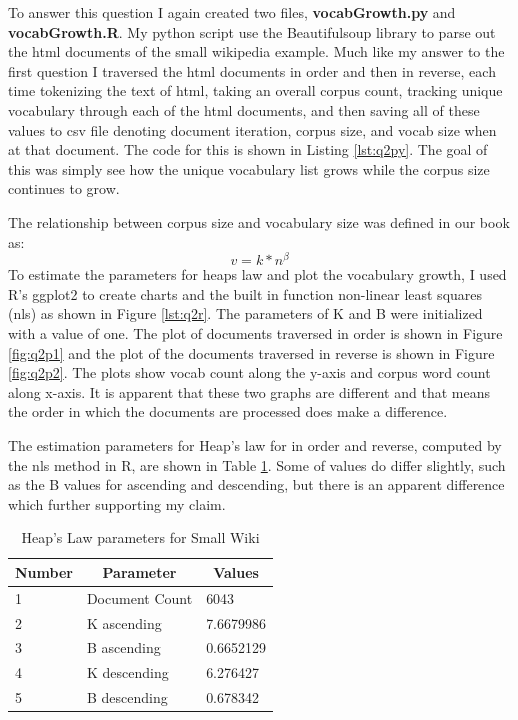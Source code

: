 \documentclass[letterpaper,11pt]{article}
\newcommand*{\srcPath}{../src}%
\begin{document}
To answer this question I again created two files, \textbf{vocabGrowth.py} and \textbf{vocabGrowth.R}.
My python script use the Beautifulsoup library to parse out the html documents of the small wikipedia example.
Much like my answer to the first question I traversed the html documents in order and then in reverse, each time tokenizing the text of html, taking an overall corpus count,  tracking unique vocabulary through each of the html documents, and then saving all of these values to csv file denoting document iteration, corpus size, and vocab size when at that document.
The code for this is shown in Listing \ref{lst:q2py}.
The goal of this was simply see how the unique vocabulary list grows while the corpus size continues to grow.

  

The relationship between corpus size and vocabulary size was defined in our book as: \[ v = k * n^\beta \]
To estimate the parameters for heaps law and plot the vocabulary growth, I used R's ggplot2 to create charts and the built in function non-linear least squares (nls) as shown in Figure \ref{lst:q2r}.
The parameters of K and B were initialized with a value of one. 
The plot of documents traversed in order is shown in Figure \ref{fig:q2p1} and the plot of the documents traversed in reverse is shown in Figure \ref{fig:q2p2}.
The plots show vocab count along the y-axis and corpus word count along x-axis.
It is apparent that these two graphs are different and that means the order in which the documents are processed does make a difference.

The estimation parameters for Heap's law for in order and reverse, computed by the nls method in R, are shown in Table \ref{table:heap}. 
Some of values do differ slightly, such as the B values for ascending and descending, but there is an apparent difference which further supporting my claim.



\begin{table}
\centering
\begin{tabular}{|l|l|l|}
\hline
\multicolumn{1}{|c|}{\textbf{Number}} & \multicolumn{1}{c|}{\textbf{Parameter}} & \multicolumn{1}{c|}{\textbf{Values}} \\ \hline
1 & Document Count & 6043 \\ \hline
2 & K ascending & 7.6679986 \\ \hline
3 & B ascending & 0.6652129 \\ \hline
4 & K descending & 6.276427 \\ \hline
5 & B descending & 0.678342 \\ \hline
\end{tabular}
\caption{Heap's Law parameters for Small Wiki}
\label{table:heap}
\end{table}
\end{document}
